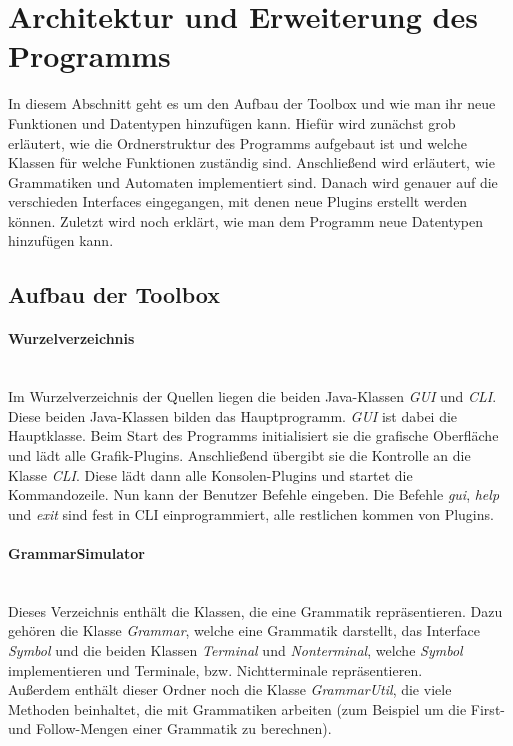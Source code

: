 \section{Architektur und Erweiterung des Programms}\raggedbottom
\label{sec:3}
In diesem Abschnitt geht es um den Aufbau der Toolbox und wie man ihr neue Funktionen und Datentypen hinzufügen kann. Hiefür wird zunächst grob erläutert, wie die Ordnerstruktur des Programms aufgebaut ist und welche Klassen für welche Funktionen zuständig sind. Anschließend wird erläutert, wie Grammatiken und Automaten implementiert sind. Danach wird genauer auf die verschieden Interfaces eingegangen, mit denen neue Plugins erstellt werden können. Zuletzt wird noch erklärt, wie man dem Programm neue Datentypen hinzufügen kann.
\subsection{Aufbau der Toolbox}
\label{sec:3.1}
\paragraph{Wurzelverzeichnis}\ \\
Im Wurzelverzeichnis der Quellen liegen die beiden Java-Klassen \textit{GUI} und \textit{CLI}. Diese beiden Java-Klassen bilden das Hauptprogramm. \textit{GUI} ist dabei die Hauptklasse. Beim Start des Programms initialisiert sie die grafische Oberfläche und lädt alle Grafik-Plugins. Anschließend übergibt sie die Kontrolle an die Klasse \textit{CLI}. Diese lädt dann alle Konsolen-Plugins und startet die Kommandozeile. Nun kann der Benutzer Befehle eingeben. Die Befehle \textit{gui}, \textit{help} und \textit{exit} sind fest in CLI einprogrammiert, alle restlichen kommen von Plugins.
\paragraph{GrammarSimulator}\ \\
Dieses Verzeichnis enthält die Klassen, die eine Grammatik repräsentieren. Dazu gehören die Klasse \textit{Grammar}, welche eine Grammatik darstellt, das Interface \textit{Symbol} und die beiden Klassen \textit{Terminal} und \textit{Nonterminal}, welche \textit{Symbol} implementieren und Terminale, bzw. Nichtterminale repräsentieren.\\
Außerdem enthält dieser Ordner noch die Klasse \textit{GrammarUtil}, die viele Methoden beinhaltet, die mit Grammatiken arbeiten (zum Beispiel um die First- und Follow-Mengen einer Grammatik zu berechnen).
